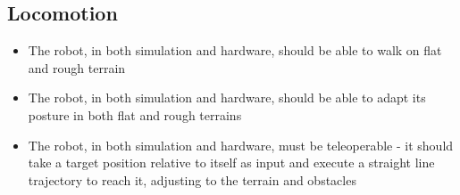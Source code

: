 \subsection{Locomotion}
\begin{itemize}
    \item The robot, in both simulation and hardware, should be able to walk on flat and rough terrain
    \item The robot, in both simulation and hardware, should be able to adapt its posture in both flat and rough terrains
    \item The robot, in both simulation and hardware, must be teleoperable - it should take a target position relative to itself as input and execute a straight line trajectory to reach it, adjusting to the terrain and obstacles
\end{itemize}
    
